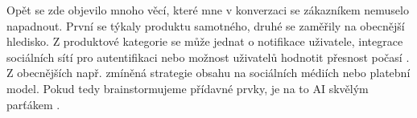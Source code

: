 \documentclass[FM,DP]{tulthesis}
\begin{document}
		Opět se zde objevilo mnoho věcí, které mne v konverzaci se zákazníkem nemuselo napadnout. První se týkaly produktu samotného, druhé se zaměřily na obecnější hledisko. Z produktové kategorie se může jednat o notifikace uživatele, integrace sociálních sítí pro autentifikaci nebo možnost uživatelů hodnotit přesnost počasí \cite{bard_analyza} \cite{chatgpt_analyza} \cite{codellama_analyza} \cite{gitCopilot_analyza} \cite{claude_analyza}. Z obecnějších např. zmíněná strategie obsahu na sociálních médiích nebo platební model. Pokud tedy brainstormujeme přídavné prvky, je na to AI skvělým parťákem \cite{bingCopilot_analyza} \cite{falcon_analyza}.
		
		
		
		
		
\end{document}
